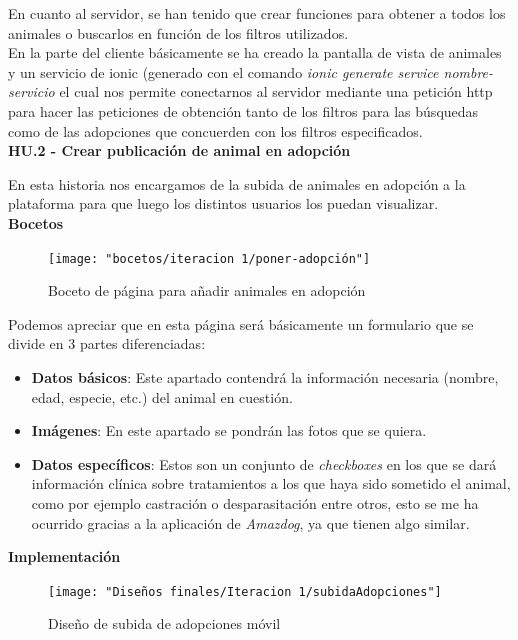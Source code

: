 En cuanto al servidor, se han tenido que crear funciones para obtener a todos los animales o buscarlos en función de los filtros utilizados. \\

En la parte del cliente básicamente se ha creado la pantalla de vista de animales y un servicio de ionic (generado con el comando \textit{ionic generate service nombre-servicio} el cual nos permite conectarnos al servidor mediante una petición http para hacer las peticiones de obtención tanto de los filtros para las búsquedas como de las adopciones que concuerden con los filtros especificados. \\ 



\Large{\textbf{HU.2 - Crear publicación de animal en adopción}}


En esta historia nos encargamos de la subida de animales en adopción a la plataforma para que luego los distintos usuarios los puedan visualizar. \\

\textbf{Bocetos}

\begin{figure}[H]
	\centering
	\texttt{[image: "bocetos/iteracion 1/poner-adopción"]}
	\caption{Boceto de página para añadir animales en adopción}
	\label{fig:poner-adopcion}
\end{figure}

Podemos apreciar que en esta página será básicamente un formulario que se divide en 3 partes diferenciadas: \\ 

\begin{itemize}
	\item \textbf{Datos básicos}: Este apartado contendrá la información necesaria (nombre, edad, especie, etc.) del animal en cuestión.
	\item \textbf{Imágenes}: En este apartado se pondrán las fotos que se quiera.
	\item \textbf{Datos específicos}: Estos son un conjunto de \textit{checkboxes} en los que se dará información  clínica sobre tratamientos a los que haya sido sometido el animal, como por ejemplo castración o desparasitación entre otros, esto se me ha ocurrido gracias a la aplicación de \textit{Amazdog}, ya que tienen algo similar.
\end{itemize}

\textbf{Implementación} \\

\begin{figure}[H]
	\centering
	\texttt{[image: "Diseños finales/Iteracion 1/subidaAdopciones"]}
	\caption{ Diseño de subida de adopciones móvil}
	\label{fig:subidaadopciones}
\end{figure}


